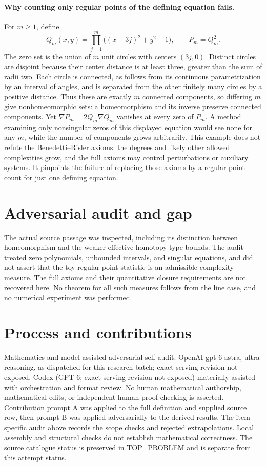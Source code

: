 \documentclass[11pt]{article}
\begin{document}
\paragraph{Why counting only regular points of the defining equation fails.}
For $m\ge1$, define
\[
Q_m(x,y)=\prod_{j=1}^m\bigl((x-3j)^2+y^2-1\bigr),\qquad P_m=Q_m^2.
\]
The zero set is the union of $m$ unit circles with centers $(3j,0)$.
Distinct circles are disjoint because their center distance is at least three,
greater than the sum of radii two. Each circle is connected, as follows from
its continuous parametrization by an interval of angles, and is separated
from the other finitely many circles by a positive distance. Thus these are
exactly $m$ connected components, so differing $m$ give nonhomeomorphic sets:
a homeomorphism and its inverse preserve connected components.
Yet $\nabla P_m=2Q_m\nabla Q_m$ vanishes at every zero of $P_m$.
A method examining only nonsingular zeros of this displayed equation would
see none for any $m$, while the number of components grows arbitrarily.
This example does not refute the Benedetti--Risler axioms: the degrees and
likely other allowed complexities grow, and the full axioms may control
perturbations or auxiliary systems. It pinpoints the failure of replacing
those axioms by a regular-point count for just one defining equation.

\section{Adversarial audit and gap}
The actual source passage was inspected, including its distinction between
homeomorphism and the weaker effective homotopy-type bounds. The audit treated
zero polynomials, unbounded intervals, and singular equations, and did not
assert that the toy regular-point statistic is an admissible complexity measure.
The full axioms and their quantitative closure requirements are not recovered
here. No theorem for all such measures follows from the line case, and no
numerical experiment was performed.

\section{Process and contributions}
Mathematics and model-assisted adversarial self-audit: OpenAI gpt-6-astra, ultra reasoning, as dispatched for this research batch; exact serving revision not exposed. Codex (GPT-6; exact serving revision not exposed) materially assisted with orchestration and format review. No human mathematical authorship, mathematical edits, or independent human proof checking is asserted.
Contribution prompt A was applied to the full definition and supplied source row, then prompt B was applied adversarially to the derived results. The item-specific audit above records the scope checks and rejected extrapolations. Local assembly and structural checks do not establish mathematical correctness. The source catalogue status is preserved in TOP\_PROBLEM and is separate from this attempt status.
\end{document}
